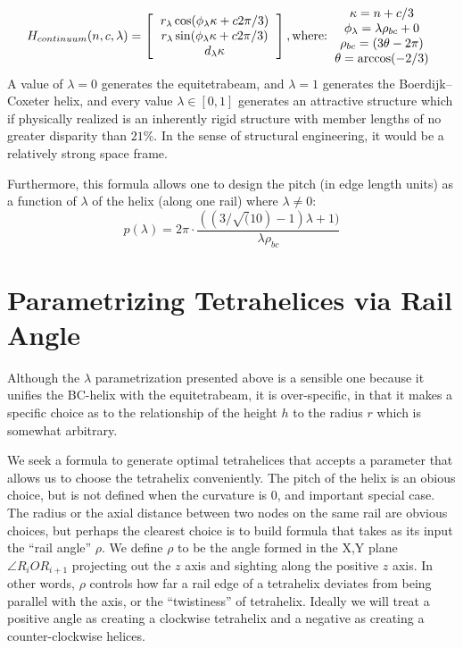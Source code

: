 \documentclass[11pt]{article}
\begin{document}
\[
H_{continuum}(n,c,\lambda) =
\left [
  \begin{tabular}{c}
   $ r_{\lambda} \cos(\phi_{\lambda} \kappa + c 2 \pi /3) $\\
   $ r_{\lambda}  \sin(\phi_{\lambda} \kappa + c 2 \pi /3) $\\
   $ d_{\lambda} \kappa $
  \end{tabular}
  \right ],
\text{where:}
  \begin{tabular}{c}
    $\kappa = n + c/3$ \\
    $ \phi_{\lambda} =  \lambda \rho_{bc}  + 0 $\\
    $\rho_{bc} = (3 \theta - 2 \pi)$ \\
   $ \theta = \arccos(-2/3) $
  \end{tabular}      
\]
A value of $\lambda = 0$ generates the equitetrabeam, and $\lambda = 1$ generates the Boerdijk--Coxeter helix, and every
value $\lambda \in [0,1]$ generates an attractive structure which if physically realized is an inherently rigid structure
with member lengths of no greater disparity than $21\%$.
In the sense of structural engineering, it would be a relatively strong space frame.

Furthermore, this formula allows one to design the pitch (in edge length units) as a function of $\lambda$ of the helix (along one rail)
where $\lambda \neq 0$:
\[
p(\lambda) = 2 \pi  \cdot \frac{((3/\sqrt(10) -1) \lambda +1)}{ \lambda  \rho_{bc} }
\]

\section{Parametrizing Tetrahelices via Rail Angle}

Although the $\lambda$ parametrization presented above is a sensible one
because it unifies the BC-helix with the equitetrabeam, it is over-specific,
in that it makes a specific choice as to the relationship of the height $h$
to the radius $r$ which is somewhat arbitrary.

We seek a formula to generate optimal tetrahelices that accepts a
parameter that allows us to choose the tetrahelix conveniently. The
pitch of the helix is an obious choice, but is not defined when the
curvature is $0$, and important special case. The radius or the axial
distance between two nodes on the same rail are obvious choices, but
perhaps the clearest choice is to build formula that takes as its
input the ``rail angle'' $\rho$. We define $\rho$ to be the angle
formed in the X,Y plane $\angle R_i O R_{i+1}$ projecting out the $z$
axis and sighting along the positive $z$ axis. In other words, $\rho$
controls how far a rail edge of a tetrahelix deviates from being
parallel with the axis, or the ``twistiness'' of tetrahelix. Ideally
we will treat a positive angle as creating a clockwise tetrahelix and
a negative as creating a counter-clockwise helices.
\end{document}
